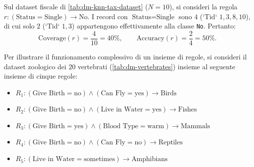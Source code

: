 \begin{example}
Sul dataset fiscale di \autoref{tab:dm-knn-tax-dataset} ($N = 10$), si consideri la regola $r: (\text{Status} = \text{Single}) \rightarrow \text{No}$. I record con $\text{Status} = \text{Single}$ sono $4$ (`Tid` $1, 3, 8, 10$), di cui solo $2$ (`Tid` $1, 3$) appartengono effettivamente alla classe \texttt{No}. Pertanto:
\begin{equation*}
    \text{Coverage}(r) = \frac{4}{10} = 40\%, \qquad \text{Accuracy}(r) = \frac{2}{4} = 50\%.
\end{equation*}
\end{example}

Per illustrare il funzionamento complessivo di un insieme di regole, si consideri il dataset zoologico dei $20$ vertebrati (\autoref{tab:dm-vertebrates}) insieme al seguente insieme di cinque regole:
\begin{itemize}
    \item $R_1: (\text{Give Birth} = \text{no}) \wedge (\text{Can Fly} = \text{yes}) \rightarrow \text{Birds}$
    \item $R_2: (\text{Give Birth} = \text{no}) \wedge (\text{Live in Water} = \text{yes}) \rightarrow \text{Fishes}$
    \item $R_3: (\text{Give Birth} = \text{yes}) \wedge (\text{Blood Type} = \text{warm}) \rightarrow \text{Mammals}$
    \item $R_4: (\text{Give Birth} = \text{no}) \wedge (\text{Can Fly} = \text{no}) \rightarrow \text{Reptiles}$
    \item $R_5: (\text{Live in Water} = \text{sometimes}) \rightarrow \text{Amphibians}$
\end{itemize}

